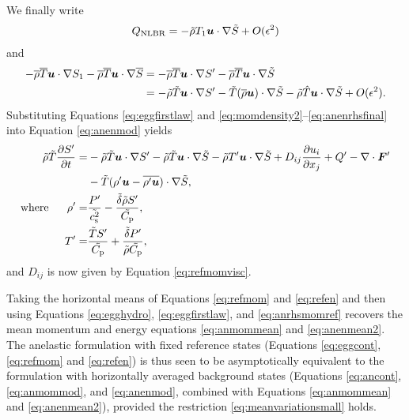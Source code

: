 \documentclass[12pt]{article}
\newcommand{\vecf}{\bm{F}}
\begin{document}
We finally write 
\begin{align}
	Q_{\rm NLBR} = -\tilde{\rho} T_1\bm{u}\cdot\nabla\tilde{S} + O(\epsilon^2)
\end{align}
and 
\begin{align}\label{eq:anenrhsfinal}
	-\overline{\rho}\overline{T} \bm{u}\cdot\nabla S_1 - \overline{\rho}\overline{T} \bm{u}\cdot\nabla\overline{S} &= - \overline{\rho}\overline{T}\bm{u}\cdot\nabla {S^\prime} -\overline{\rho}\overline{T}\bm{u}\cdot\nabla\tilde{S} \nonumber\\
	&=-\tilde{\rho}\tilde{T}\bm{u}\cdot\nabla {S^\prime} - \tilde{T}(\overline{\rho} \bm{u})\cdot\nabla\tilde{S} - \tilde{\rho}\hat{T}\bm{u}\cdot\nabla\tilde{S} + O(\epsilon^2).
\end{align}
Substituting Equations \eqref{eq:eggfirstlaw} and \eqref{eq:momdensity2}--\eqref{eq:anenrhsfinal} into Equation \eqref{eq:anenmod} yields
\begin{subequations}\label{eq:refen}
	\begin{align}
		\rhotilde\tmptilde\pderiv{\entrprime}{t}= &-\rhotilde\tmptilde\ugrad \entrprime - \rhotilde\tmptilde \ugrad \entrtilde - \rhotilde \tmpprime\ugrad\entrtilde+D_{ij}\pderiv{u_i}{x_j} + Q^\prime- \Div\vecf^\prime  \nonumber\\
		& - \tmptilde(\rhoprime \vecu-\overline{\rhoprime\vecu})\cdot\nabla\entrtilde,\label{eq:refenmain}\\
		\where \rhoprime =& \frac{\prsprime}{\tilde{\cs^2}}-\frac{\deltatilde \rhotilde S ^\prime}{\cptilde},\label{eq:refenrhopert}\\
		 \tmpprime = & \frac{\tmptilde \entrprime}{\cptilde} + \frac{\deltatilde  \prsprime}{\rhotilde\cptilde},\label{eq:refentmppert}
	\end{align}
\end{subequations}
and $D_{ij}$ is now given by Equation \eqref{eq:refmomvisc}. 

Taking the horizontal means of Equations \eqref{eq:refmom} and \eqref{eq:refen} and then using Equations \eqref{eq:egghydro}, \eqref{eq:eggfirstlaw}, and \eqref{eq:anrhsmomref} recovers the mean momentum and energy equations \eqref{eq:anmommean} and \eqref{eq:anenmean2}. The anelastic formulation with fixed reference states (Equations \eqref{eq:eggcont}, \eqref{eq:refmom} and \eqref{eq:refen}) is thus seen to be asymptotically equivalent to the formulation with horizontally averaged background states (Equations \eqref{eq:ancont}, \eqref{eq:anmommod}, and \eqref{eq:anenmod}, combined with Equations \eqref{eq:anmommean} and \eqref{eq:anenmean2}), provided the restriction \eqref{eq:meanvariationsmall} holds.
\end{document}

